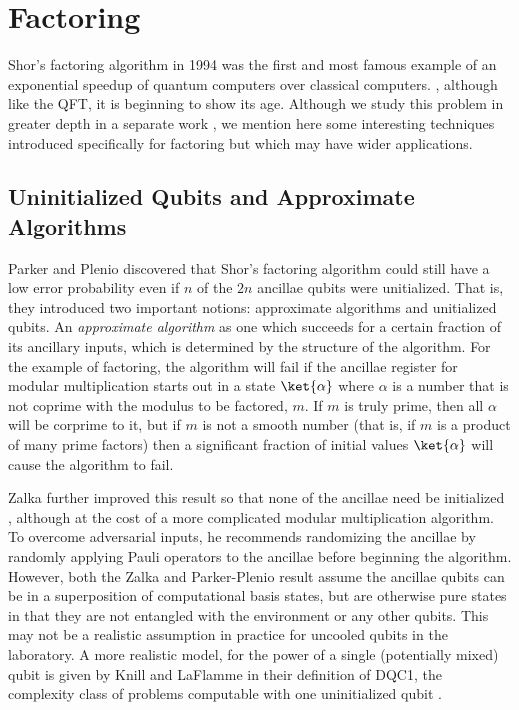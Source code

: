 \section{Factoring}
\label{sec:factor}

Shor's factoring algorithm in 1994 was the first and most famous example of an
exponential speedup of quantum computers over classical computers.
\cite{Shor1994}, although like the QFT, it is beginning to show its age.
Although we study this problem in greater depth in a separate work
\cite{Pham2012b}, we mention here some interesting techniques introduced
specifically for factoring but which may have wider applications.

\subsection{Uninitialized Qubits and Approximate Algorithms}

Parker and Plenio \cite{Parker2000} discovered that Shor's factoring algorithm
could still have a low error probability even if $n$ of the $2n$ ancillae qubits
were unitialized. That is, they introduced two important notions: approximate
algorithms and unitialized qubits.
An \emph{approximate algorithm} as one which succeeds for a certain fraction of
its ancillary inputs, which is determined by the structure of the algorithm.
For the example of factoring, the algorithm will fail if the ancillae
register for modular multiplication starts out in a state $\ket{\alpha}$
where $\alpha$ is a number that is not coprime with the modulus to be factored,
$m$. If $m$ is truly prime, then all $\alpha$ will be corprime to it, but
if $m$ is not a smooth number (that is, if $m$ is a product of many prime
factors) then a significant fraction of initial values $\ket{\alpha}$ will
cause the algorithm to fail.

Zalka further improved this result so that none of
the ancillae need be initialized \cite{Zalka2006}, although at the cost of
a more complicated modular multiplication algorithm.
To overcome adversarial inputs,
he recommends randomizing the ancillae by randomly applying Pauli operators
to the ancillae before beginning the algorithm.
However, both the Zalka and Parker-Plenio result assume the ancillae qubits
can be in a superposition of computational basis states, but are otherwise
pure states in that they are not entangled with the environment or any other
qubits. This may not be a realistic assumption in practice for uncooled
qubits in the laboratory. A more realistic model, for the power of a
single (potentially mixed) qubit is given by Knill and LaFlamme in their
definition of DQC1, the complexity class of problems computable with one
uninitialized qubit \cite{Knill1998}.


